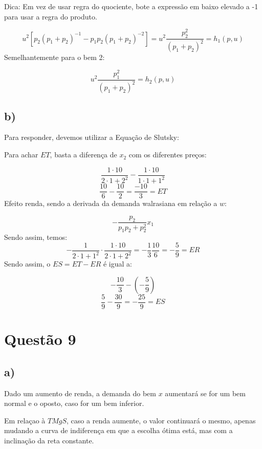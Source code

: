 \documentclass[
  letterpaper,
  DIV=11,
  numbers=noendperiod]{scrartcl}
\begin{document}
Dica: Em vez de usar regra do quociente, bote a expressão em baixo
elevado a -1 para usar a regra do produto.

\[
u^2 \left[ 
p_2  (p_1 + p_2)^{-1}- p_1p_2(p_1 + p_2)^{-2}\right] = u^2\frac{p_2^2}{(p_1 + p_2)^2} =
h_1(p,u)
\] Semelhantemente para o bem 2:

\[
u^2\frac{p_1^2}{(p_1 + p_2)^2} = h_2(p,u)
\]

\subsection{b)}\label{b-4}

Para responder, devemos utilizar a Equação de Slutsky:

Para achar \(ET\), basta a diferença de \(x_2\) com os diferentes
preços:

\[
\frac{1\cdot 10}{2 \cdot 1 + 2^2} - \frac{1 \cdot 10}{1 \cdot 1 + 1^2}
\] \[
\frac{10}{6}-\frac{10}{2} = \frac{-10}{3} = ET
\] Efeito renda, sendo a derivada da demanda walrasiana em relação a
\(w\):

\[
-\frac{p_2}{p_1p_2 + p_2^2}x_1
\] Sendo assim, temos: \[
-\frac{1}{2 \cdot 1 + 1^2}\cdot \frac{1 \cdot 10}{2 \cdot 1 + 2^2} = -\frac{1}{3}\frac{10}{6} = 
-\frac{5}{9} = ER
\] Sendo assim, o \(ES = ET - ER\) é igual a:

\[
-\frac{10}{3}-\left(-\frac{5}{9}\right)
\] \[
\frac{5}{9}-\frac{30}{9} = -\frac{25}{9} = ES
\]

\section{Questão 9}\label{questuxe3o-9}

\subsection{a)}\label{a-5}

Dado um aumento de renda, a demanda do bem \(x\) aumentará se for um bem
normal e o oposto, caso for um bem inferior.

Em relaçao à \(TMgS\), caso a renda aumente, o valor continuará o mesmo,
apenas mudando a curva de indiferença em que a escolha ótima está, mas
com a inclinação da reta constante.
\end{document}
